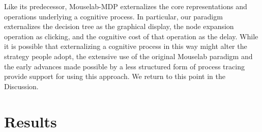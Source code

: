 \label{predecessor}
Like its predecessor, Mouselab-MDP externalizes the core representations and operations underlying a cognitive process. In particular, our paradigm externalizes the decision tree as the graphical display, the node expansion operation as clicking, and the cognitive cost of that operation as the delay. While it is possible that externalizing a cognitive process in this way might alter the strategy people adopt, the extensive use of the original Mouselab paradigm \citep{payne1988adaptive,ford1989process,payne1993adaptive,gabaix2006costly,schulte-mecklenbeck2011visiting} and the early advances made possible by a less structured form of process tracing \citep{degroot1965thought,newell1972human,chase1973perception} provide support for using this approach. We return to this point in the Discussion.


\section{Results}\label{sec:planning-results}



